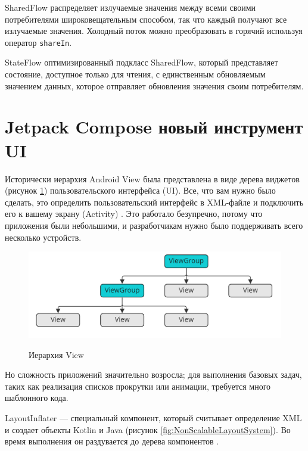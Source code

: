 SharedFlow распределяет излучаемые значения между всеми своими потребителями широковещательным способом, так что каждый получают все излучаемые значения. Холодный поток можно преобразовать в горячий используя оператор \verb|shareIn|.

StateFlow оптимизированный подкласс SharedFlow, который представляет состояние, доступное только для чтения, с единственным обновляемым значением данных, которое отправляет обновления значения своим потребителям.





\section{Jetpack Compose новый инструмент UI}

Исторически иерархия Android View была представлена в виде дерева виджетов (рисунок \ref{fig:ViewHierarchy}) пользовательского интерфейса (UI). Все, что вам нужно было сделать, это определить пользовательский интерфейс в XML-файле и подключить его к вашему экрану (Activity) \cite{Kotlin2}. Это работало безупречно, потому что приложения были небольшими, и разработчикам нужно было поддерживать всего несколько устройств.

\begin{figure}[h!]
    \begin{center}
        \includegraphics[width=1.05\hsize]{fig/view.png}\\[2mm]
        \caption{Иерархия View}\label{fig:ViewHierarchy}
    \end{center}
\end{figure}

Но сложность приложений значительно возросла; для выполнения базовых задач, таких как реализация списков прокрутки или анимации, требуется много шаблонного кода.

LayoutInflater — специальный компонент, который считывает определение XML и создает объекты Kotlin и Java (рисунок \ref{fig:NonScalableLayoutSystem}). Во время выполнения он раздувается до дерева компонентов \cite{Jetpack}.

